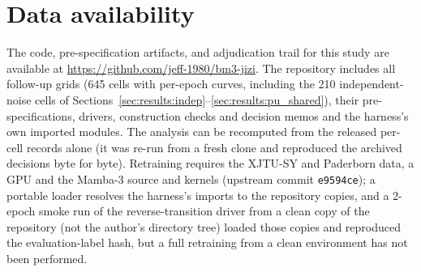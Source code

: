 \documentclass[preprint,12pt]{elsarticle}
\begin{document}
\section*{Data availability}
The code, pre-specification artifacts, and adjudication trail for this study are available at \url{https://github.com/jeff-1980/bm3-jizi}. The repository includes all follow-up grids (645 cells with per-epoch curves, including the 210 independent-noise cells of Sections~\ref{sec:results:indep}--\ref{sec:results:pu_shared}), their pre-specifications, drivers, construction checks and decision memos and the harness's own imported modules. The analysis can be recomputed from the released per-cell records alone (it was re-run from a fresh clone and reproduced the archived decisions byte for byte). Retraining requires the XJTU-SY and Paderborn data, a GPU and the Mamba-3 source and kernels (upstream commit \texttt{e9594ce}); a portable loader resolves the harness's imports to the repository copies, and a 2-epoch smoke run of the reverse-transition driver from a clean copy of the repository (not the author's directory tree) loaded those copies and reproduced the evaluation-label hash, but a full retraining from a clean environment has not been performed.

\appendix







\end{document}

